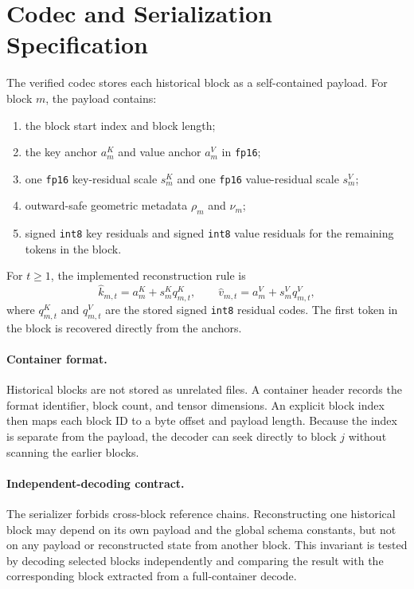 \section{Codec and Serialization Specification}
\label{app:codec}

The verified codec stores each historical block as a self-contained payload. For block \(m\), the payload contains:
\begin{enumerate}[leftmargin=1.6em]
  \item the block start index and block length;
  \item the key anchor \(a^K_m\) and value anchor \(a^V_m\) in \texttt{fp16};
  \item one \texttt{fp16} key-residual scale \(s^K_m\) and one \texttt{fp16} value-residual scale \(s^V_m\);
  \item outward-safe geometric metadata \(\rho_m\) and \(\nu_m\);
  \item signed \texttt{int8} key residuals and signed \texttt{int8} value residuals for the remaining tokens in the block.
\end{enumerate}

For \(t \ge 1\), the implemented reconstruction rule is
\begin{equation}
  \hat{k}_{m,t} = a^K_m + s^K_m q^K_{m,t},
  \qquad
  \hat{v}_{m,t} = a^V_m + s^V_m q^V_{m,t},
\end{equation}
where \(q^K_{m,t}\) and \(q^V_{m,t}\) are the stored signed \texttt{int8} residual codes. The first token in the block is recovered directly from the anchors.

\paragraph{Container format.}
Historical blocks are not stored as unrelated files. A container header records the format identifier, block count, and tensor dimensions. An explicit block index then maps each block ID to a byte offset and payload length. Because the index is separate from the payload, the decoder can seek directly to block \(j\) without scanning the earlier blocks.

\paragraph{Independent-decoding contract.}
The serializer forbids cross-block reference chains. Reconstructing one historical block may depend on its own payload and the global schema constants, but not on any payload or reconstructed state from another block. This invariant is tested by decoding selected blocks independently and comparing the result with the corresponding block extracted from a full-container decode.

